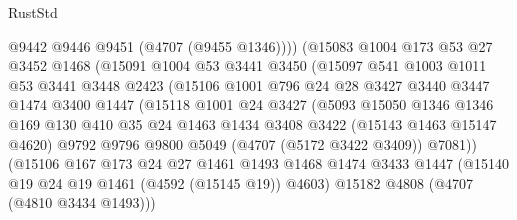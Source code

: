 \begin{lexlean}{RustStd}
\begin{coremodule}
                        @9442
                        @9446
                        @9451
                        (@4707 (@9455 @1346))))
                    (@15083
                      @1004
                      @173
                      @53
                      @27
                      @3452
                      @1468
                      (@15091
                        @1004
                        @53
                        @3441
                        @3450
                        (@15097
                          @541
                          @1003
                          @1011
                          @53
                          @3441
                          @3448
                          @2423
                          (@15106
                            @1001
                            @796
                            @24
                            @28
                            @3427
                            @3440
                            @3447
                            @1474
                            @3400
                            @1447
                            (@15118
                              @1001
                              @24
                              @3427
                              (@5093
                                @15050
                                @1346
                                @1346
                                @169
                                @130
                                @410
                                @35
                                @24
                                @1463
                                @1434
                                @3408
                                @3422
                                (@15143 @1463 @15147 @4620)
                                @9792
                                @9796
                                @9800
                                @5049
                                (@4707 (@5172 @3422 @3409))
                                @7081))
                            (@15106
                              @167
                              @173
                              @24
                              @27
                              @1461
                              @1493
                              @1468
                              @1474
                              @3433
                              @1447
                              (@15140 @19 @24 @19 @1461 (@4592 (@15145 @19)) @4603)
                              @15182
                              @4808
                              (@4707 (@4810 @3434 @1493)))

\end{coremodule}
\end{lexlean}
